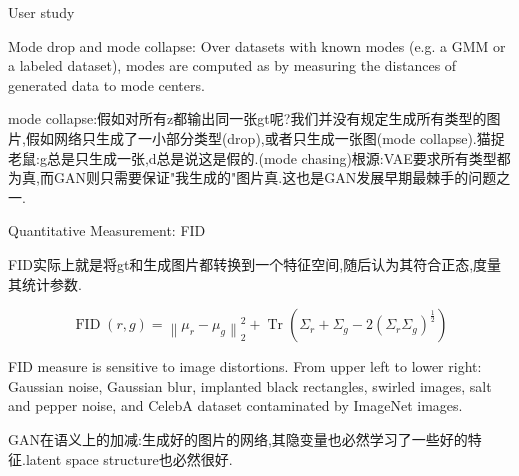 	User study
	
	Mode drop and mode collapse: Over datasets with known modes (e.g. a GMM or a labeled dataset), modes are computed as by measuring the distances of generated data to mode centers.
	
	mode collapse:假如对所有z都输出同一张gt呢?我们并没有规定生成所有类型的图片,假如网络只生成了一小部分类型(drop),或者只生成一张图(mode collapse).猫捉老鼠:g总是只生成一张,d总是说这是假的.(mode chasing)根源:VAE要求所有类型都为真,而GAN则只需要保证"我生成的"图片真.这也是GAN发展早期最棘手的问题之一.
	
	Quantitative Measurement: FID
	
	FID实际上就是将gt和生成图片都转换到一个特征空间,随后认为其符合正态,度量其统计参数.
	
	\begin{equation}
		\operatorname{FID}(r, g)=\left\|\mu_{r}-\mu_{g}\right\|_{2}^{2}+\operatorname{Tr}\left(\Sigma_{r}+\Sigma_{g}-2\left(\Sigma_{r} \Sigma_{g}\right)^{\frac{1}{2}}\right)
	\end{equation}
	
	FID measure is sensitive to image distortions. From upper left to lower right: Gaussian noise, Gaussian blur, implanted black rectangles, swirled images, salt and pepper noise, and CelebA dataset contaminated by ImageNet images.
	
	GAN在语义上的加减:生成好的图片的网络,其隐变量也必然学习了一些好的特征.latent space structure也必然很好.
	